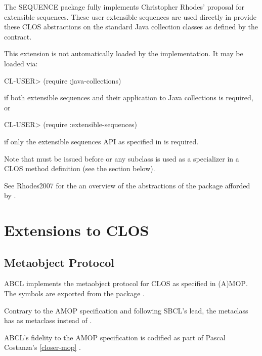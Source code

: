 \documentclass[10pt]{book}
\begin{document}
The SEQUENCE package fully implements Christopher Rhodes' proposal for
extensible sequences.  These user extensible sequences are used
directly in  provide these CLOS
abstractions on the standard Java collection classes as defined by the
 contract.



This extension is not automatically loaded by the implementation.   It
may be loaded via:

\begin{listing-lisp}
CL-USER> (require :java-collections)
\end{listing-lisp}

if both extensible sequences and their application to Java collections
is required, or

\begin{listing-lisp}
CL-USER> (require :extensible-sequences)
\end{listing-lisp}

if only the extensible sequences API as specified in \cite{RHODES2007} is
required.

Note that  must be issued before
 or any subclass is used as a specializer in a \textsc{CLOS}
method definition (see the section below).

See Rhodes2007 \cite{RHODES2007} for the an overview of the
abstractions of the  package afforded by
.

\section{Extensions to CLOS}

\subsection{Metaobject Protocol}

\textsc{ABCL} implements the metaobject protocol for \textsc{CLOS} as
specified in \textsc{(A)MOP}.  The symbols are exported from the
package .

Contrary to the AMOP specification and following \textsc{SBCL}'s lead,
the metaclass  has
 as metaclass instead of
.

\textsc{ABCL}'s fidelity to the AMOP specification is codified as part
of Pascal Costanza's  \ref{closer-mop} \cite{closer-mop}.
\end{document}
